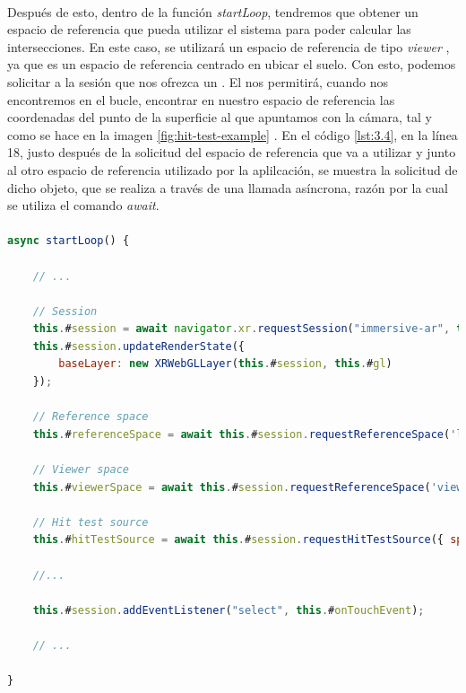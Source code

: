 \documentclass{subfiles}
\begin{document}
        \paragraph{}
        Después de esto, dentro de la función \textit{startLoop}, tendremos que obtener un espacio de referencia que pueda utilizar el sistema para poder calcular las intersecciones. En este caso, se utilizará un espacio de referencia de tipo \textit{viewer} \cite{web:webxr_referencespace}, ya que es un espacio de referencia centrado en ubicar el suelo. Con esto, podemos solicitar a la sesión que nos ofrezca un \hittestsource. El \hittestsource nos permitirá, cuando nos encontremos en el bucle, encontrar en nuestro espacio de referencia las coordenadas del punto de la superficie al que apuntamos con la cámara, tal y como se hace en la imagen \ref{fig:hit-test-example} \cite{web:mozilla_xrhittestsource}. En el código \ref{lst:3.4}, en la línea 18, justo después de la solicitud del espacio de referencia que va a utilizar y junto al otro espacio de referencia utilizado por la aplilcación, se muestra la solicitud de dicho objeto, que se realiza a través de una llamada asíncrona, razón por la cual se utiliza el comando \textit{await}.

\paragraph{}
\begin{lstlisting}[language=JavaScript, caption={Solicitud de Hit Test Source a la Sesión y creación de evento.}, label={lst:3.4}]
async startLoop() {

    // ...

    // Session
    this.#session = await navigator.xr.requestSession("immersive-ar", this.#SESSIONOPTIONS);
    this.#session.updateRenderState({
        baseLayer: new XRWebGLLayer(this.#session, this.#gl)
    });

    // Reference space
    this.#referenceSpace = await this.#session.requestReferenceSpace('local');

    // Viewer space
    this.#viewerSpace = await this.#session.requestReferenceSpace('viewer');

    // Hit test source
    this.#hitTestSource = await this.#session.requestHitTestSource({ space: this.#viewerSpace });

    //...

    this.#session.addEventListener("select", this.#onTouchEvent);

    // ...
    
}
\end{lstlisting}
\end{document}
